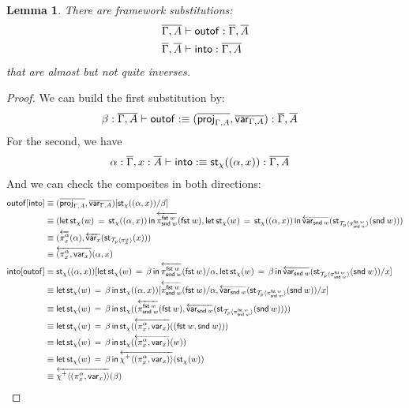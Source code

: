 \documentclass[10pt]{article}
\newtheorem{lemma}{Lemma}
\theoremstyle{definition}
\newcommand\dsd[1]{\ensuremath{\mathsf{#1}}}
\newcommand{\yields}{\vdash}
\newcommand{\app}[2]{\ensuremath{#1 \: #2}}
\newcommand{\fst}[1]{\app{\dsd{fst}}{#1}}
\newcommand{\snd}[1]{\app{\dsd{snd}}{#1}}
\newcommand{\rewrite}[2]{\overleftarrow{#1}(#2)}
\newcommand\StI[2]{\ensuremath{\mathsf{st}_{#1}(#2)}}
\newcommand\StE[4]{\ensuremath{\mathsf{let} \, \StI{#1}{#3} \, = \, {#2} \, \mathsf{in} \, #4}}
\newcommand\ApEl[2]{\mathcal{T}_{#1}\langle#2\rangle}
\newcommand\ApPlus[2]{\ensuremath{{#1}^+ \langle #2 \rangle }}
\begin{document}
\begin{lemma}
There are framework substitutions:
\begin{align*}
\upstairs{\Gamma, A} &\yields \mathsf{outof} : \upstairs{\Gamma}, \upstairs{A} \\
\upstairs{\Gamma}, \upstairs{A} &\yields \mathsf{into} : \upstairs{\Gamma, A}
\end{align*}
that are almost but not quite inverses.
\end{lemma}
\begin{proof}
We can build the first substitution by:
\begin{align*}
\beta : \upstairs{\Gamma, A} &\yields \mathsf{outof} :\equiv (\upstairs{\proj{\Gamma, A}}, \upstairs{\var{\Gamma, A}}) : \upstairs{\Gamma}, \upstairs{A}
\end{align*}
For the second, we have
\begin{align*}
\alpha : \upstairs{\Gamma}, x : \upstairs{A} &\yields \mathsf{into} :\equiv \StI{\chi}{(\alpha, x)} : \upstairs{\Gamma, A}
\end{align*}
And we can check the composites in both directions:
\begin{align*}
\mathsf{outof}[\mathsf{into}]
&\equiv (\upstairs{\proj{\Gamma, A}}, \upstairs{\var{\Gamma, A}})[\StI{\chi}{(\alpha, x)}/\beta] \\
&\equiv (\StE{\chi}{\StI{\chi}{(\alpha, x)}}{w}{\rewrite{\pi^{\fst w}_{\snd w}}{\fst w}}, \StE{\chi}{\StI{\chi}{(\alpha, x)}}{w}{\rewrite{\var{\snd w}}{\StI{\ApEl{p}{\pi^{\fst w}_{\snd w}}}{\snd w}}}) \\
&\equiv (\rewrite{\pi^\alpha_x}{\alpha}, \rewrite{\var{x}}{\StI{\ApEl{p}{\pi^{\alpha}_x}}{x}}) \\
&\equiv \rewrite{(\pi^\alpha_x, \var{x})}{\alpha, x} \\
\mathsf{into}[\mathsf{outof}]
&\equiv \StI{\chi}{(\alpha, x)}[\StE{\chi}{\beta}{w}{\rewrite{\pi^{\fst w}_{\snd w}}{\fst w}}/\alpha, \StE{\chi}{\beta}{w}{\rewrite{\var{\snd w}}{\StI{\ApEl{p}{\pi^{\fst w}_{\snd w}}}{\snd w}}} / x] \\
&\equiv \StE{\chi}{\beta}{w}{\StI{\chi}{(\alpha, x)}[\rewrite{\pi^{\fst w}_{\snd w}}{\fst w}/\alpha, \rewrite{\var{\snd w}}{\StI{\ApEl{p}{\pi^{\fst w}_{\snd w}}}{\snd w}} / x]} \\
&\equiv \StE{\chi}{\beta}{w}{\StI{\chi}{(\rewrite{\pi^{\fst w}_{\snd w}}{\fst w}, \rewrite{\var{\snd w}}{\StI{\ApEl{p}{\pi^{\fst w}_{\snd w}}}{\snd w})}}} \\
&\equiv \StE{\chi}{\beta}{w}{\StI{\chi}{\rewrite{(\pi^\alpha_x, \var{x})}{(\fst w, \snd w)}}} \\
&\equiv \StE{\chi}{\beta}{w}{\StI{\chi}{\rewrite{(\pi^\alpha_x, \var{x})}{w}}} \\
&\equiv \StE{\chi}{\beta}{w}{\rewrite{\ApPlus{\chi}{(\pi^\alpha_x, \var{x})}}{\StI{\chi}{w}}} \\
&\equiv \rewrite{\ApPlus{\chi}{(\pi^\alpha_x, \var{x})}}{\beta}
\end{align*}
\end{proof}
\end{document}
